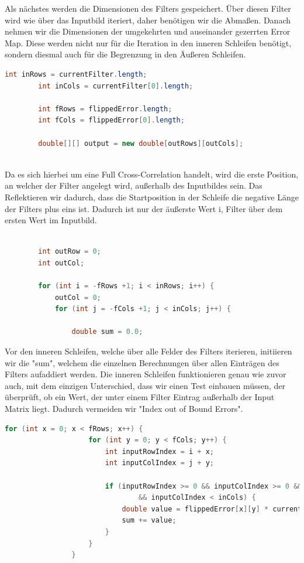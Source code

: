 \documentclass[12pt]{article}
\begin{document}
Als nächstes werden die Dimensionen des Filters gespeichert. Über diesen Filter wird wie über das Inputbild iteriert, daher benötigen wir die Abmaßen. Danach nehmen wir die Dimensionen der umgekehrten und auseinander gezerrten Error Map. Diese werden nicht nur für die Iteration in den inneren Schleifen benötigt, sondern diesmal auch für die Begrenzung in den Äußeren Schleifen. 
\begin{lstlisting}[language=Java]
        int inRows = currentFilter.length;
        int inCols = currentFilter[0].length;

        int fRows = flippedError.length;
        int fCols = flippedError[0].length;

        double[][] output = new double[outRows][outCols];
        
\end{lstlisting}
        Da es sich hierbei um eine Full Cross-Correlation handelt, wird die erste Position, an welcher der Filter angelegt wird, außerhalb des Inputbildes sein. Das Reflektieren wir dadurch, dass die Startposition in der Schleife die negative Länge der Filters plus eins ist. Dadurch ist nur der äußerste Wert i, Filter über dem ersten Wert im Inputbild.
\begin{lstlisting}[language=Java]

        int outRow = 0;
        int outCol;

        for (int i = -fRows +1; i < inRows; i++) {
            outCol = 0;
            for (int j = -fCols +1; j < inCols; j++) {

                double sum = 0.0;

\end{lstlisting}
Vor den inneren Schleifen, welche über alle Felder des Filters iterieren, initiieren wir die "sum", welchem die einzelnen Berechnungen über allen Einträgen des Filters aufaddiert werden. Die inneren Schleifen funktionieren genau wie zuvor auch, mit dem einzigen Unterschied, dass wir einen Test einbauen müssen, der überprüft, ob ein Wert, der unter einem Filter Eintrag außerhalb der Input Matrix liegt. Dadurch vermeiden wir "Index out of Bound Errors".
\begin{lstlisting}[language=Java]
                for (int x = 0; x < fRows; x++) {
                    for (int y = 0; y < fCols; y++) {
                        int inputRowIndex = i + x;
                        int inputColIndex = j + y;

                        if (inputRowIndex >= 0 && inputColIndex >= 0 && inputRowIndex < inRows
                                && inputColIndex < inCols) {
                            double value = flippedError[x][y] * currentFilter[inputRowIndex][inputColIndex];
                            sum += value;
                        }
                    }
                }
                
\end{lstlisting}
\end{document}
